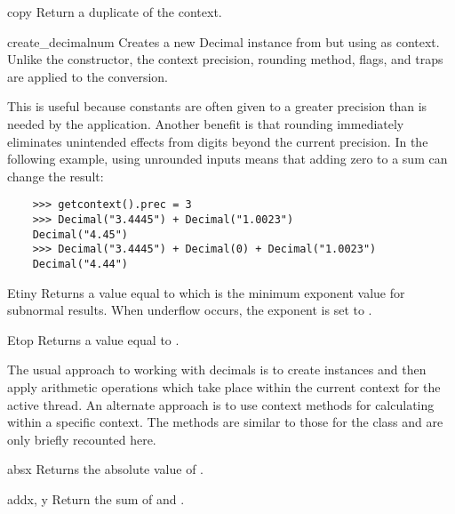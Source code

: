 \begin{methoddesc}{copy}{}
  Return a duplicate of the context.
\end{methoddesc}  

\begin{methoddesc}{create_decimal}{num}
  Creates a new Decimal instance from  but using  as
  context. Unlike the  constructor, the context precision,
  rounding method, flags, and traps are applied to the conversion.

  This is useful because constants are often given to a greater precision than
  is needed by the application.  Another benefit is that rounding immediately
  eliminates unintended effects from digits beyond the current precision.
  In the following example, using unrounded inputs means that adding zero
  to a sum can change the result:

  \begin{verbatim}
    >>> getcontext().prec = 3
    >>> Decimal("3.4445") + Decimal("1.0023")
    Decimal("4.45")
    >>> Decimal("3.4445") + Decimal(0) + Decimal("1.0023")
    Decimal("4.44")
  \end{verbatim}
      
\end{methoddesc} 

\begin{methoddesc}{Etiny}{}
  Returns a value equal to  which is the minimum
  exponent value for subnormal results.  When underflow occurs, the
  exponent is set to .
\end{methoddesc} 

\begin{methoddesc}{Etop}{}
  Returns a value equal to .
\end{methoddesc} 


The usual approach to working with decimals is to create 
instances and then apply arithmetic operations which take place within the
current context for the active thread.  An alternate approach is to use
context methods for calculating within a specific context.  The methods are
similar to those for the  class and are only briefly recounted
here.

\begin{methoddesc}{abs}{x}
  Returns the absolute value of .
\end{methoddesc}

\begin{methoddesc}{add}{x, y}
  Return the sum of  and .
\end{methoddesc}
   
